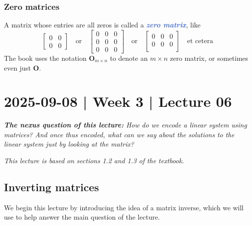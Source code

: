 \documentclass[10pt]{article}
\newcommand{\demph}[1]{\textcolor{RoyalBlue}{\textbf{\slshape #1}}} %
\theoremstyle{definition}
\begin{document}
\subsubsection{Zero matrices}

A matrix whose entries are all zeros is called a \demph{zero matrix}, like
\begin{equation*}
  \begin{bmatrix}
    0&0\\
    0&0
  \end{bmatrix}
  \quad \text{or} \quad
  \begin{bmatrix}
    0&0&0\\
    0&0&0\\
    0&0&0
  \end{bmatrix}
  \quad \text{or} \quad
  \begin{bmatrix}
    0&0&0\\
    0&0&0\\
  \end{bmatrix}
  \quad \text{et cetera}
\end{equation*}
The book uses the notation $\mathbf{O}_{m\times n}$ to denote an $m\times n$
zero matrix, or sometimes even just $\mathbf{O}$.

\newpage
\section{2025-09-08 | Week 3 | Lecture 06}

\begin{center}
  \begin{tcolorbox}[width=0.9\textwidth, colback=white, colframe=black]
    \textit{\textbf{The nexus question of this lecture:} How do we encode a
      linear system using matrices? And once thus encoded, what can we say
      about the solutions to the linear system just by looking at the matrix?}
  \end{tcolorbox}
\end{center}

\textit{This lecture is based on sections 1.2 and 1.3 of the textbook.} 


\subsection{Inverting matrices}
We begin this lecture by introducing the idea of a matrix inverse, which we
will use to help answer the main question of the lecture.
\end{document}
